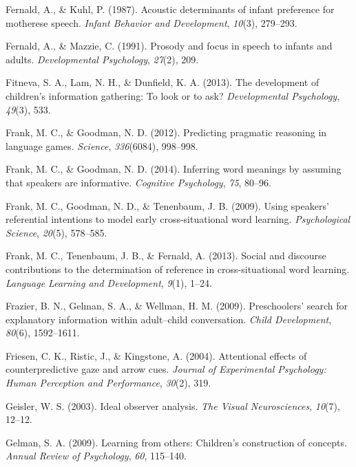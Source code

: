 \documentclass[oneside]{report}
\begin{document}
\hypertarget{ref-fernald1987acoustic}{}
Fernald, A., \& Kuhl, P. (1987). Acoustic determinants of infant
preference for motherese speech. \emph{Infant Behavior and Development},
\emph{10}(3), 279--293.

\hypertarget{ref-fernald1991prosody}{}
Fernald, A., \& Mazzie, C. (1991). Prosody and focus in speech to
infants and adults. \emph{Developmental Psychology}, \emph{27}(2), 209.

\hypertarget{ref-fitneva2013development}{}
Fitneva, S. A., Lam, N. H., \& Dunfield, K. A. (2013). The development
of children's information gathering: To look or to ask?
\emph{Developmental Psychology}, \emph{49}(3), 533.

\hypertarget{ref-frank2012predicting}{}
Frank, M. C., \& Goodman, N. D. (2012). Predicting pragmatic reasoning
in language games. \emph{Science}, \emph{336}(6084), 998--998.

\hypertarget{ref-frank2014inferring}{}
Frank, M. C., \& Goodman, N. D. (2014). Inferring word meanings by
assuming that speakers are informative. \emph{Cognitive Psychology},
\emph{75}, 80--96.

\hypertarget{ref-frank2009using}{}
Frank, M. C., Goodman, N. D., \& Tenenbaum, J. B. (2009). Using
speakers' referential intentions to model early cross-situational word
learning. \emph{Psychological Science}, \emph{20}(5), 578--585.

\hypertarget{ref-frank2013social}{}
Frank, M. C., Tenenbaum, J. B., \& Fernald, A. (2013). Social and
discourse contributions to the determination of reference in
cross-situational word learning. \emph{Language Learning and
Development}, \emph{9}(1), 1--24.

\hypertarget{ref-frazier2009preschoolers}{}
Frazier, B. N., Gelman, S. A., \& Wellman, H. M. (2009). Preschoolers'
search for explanatory information within adult--child conversation.
\emph{Child Development}, \emph{80}(6), 1592--1611.

\hypertarget{ref-friesen2004attentional}{}
Friesen, C. K., Ristic, J., \& Kingstone, A. (2004). Attentional effects
of counterpredictive gaze and arrow cues. \emph{Journal of Experimental
Psychology: Human Perception and Performance}, \emph{30}(2), 319.

\hypertarget{ref-geisler2003ideal}{}
Geisler, W. S. (2003). Ideal observer analysis. \emph{The Visual
Neurosciences}, \emph{10}(7), 12--12.

\hypertarget{ref-gelman2009learning}{}
Gelman, S. A. (2009). Learning from others: Children's construction of
concepts. \emph{Annual Review of Psychology}, \emph{60}, 115--140.
\end{document}
